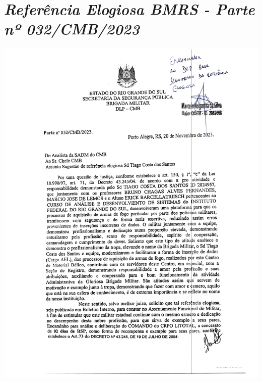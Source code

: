 \chapter{\textit{Referência Elogiosa BMRS - Parte nº 032/CMB/2023}}

\label{sec:anexoe}
\includegraphics[scale=0.8]{imagens/PORTARIA-INTERNA-BMRS.pdf}

